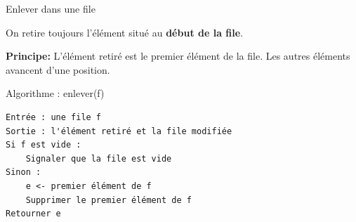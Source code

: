 \documentclass[10pt]{beamer}
\begin{document}
\begin{frame}[fragile]{Enlever dans une file}

On retire toujours l'élément situé au
\textbf{début de la file}.

\medskip

\textbf{Principe: }
L'élément retiré est le premier élément de la file.
Les autres éléments avancent d'une position.

\medskip

\begin{exampleblock}{Algorithme : enlever(f)}
\begin{verbatim}
Entrée : une file f
Sortie : l'élément retiré et la file modifiée
Si f est vide :
    Signaler que la file est vide
Sinon :
    e <- premier élément de f
    Supprimer le premier élément de f
Retourner e
\end{verbatim}
\end{exampleblock}

\medskip

\begin{center}
\end{center}

\end{frame}
\end{document}
